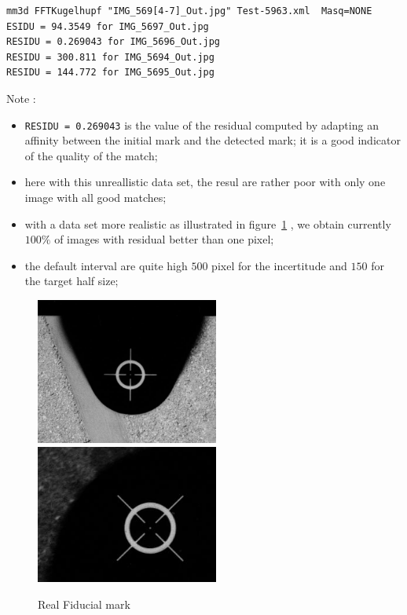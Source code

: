 \begin{verbatim}
mm3d FFTKugelhupf "IMG_569[4-7]_Out.jpg" Test-5963.xml  Masq=NONE 
ESIDU = 94.3549 for IMG_5697_Out.jpg
RESIDU = 0.269043 for IMG_5696_Out.jpg
RESIDU = 300.811 for IMG_5694_Out.jpg
RESIDU = 144.772 for IMG_5695_Out.jpg
\end{verbatim}

Note :

\begin{itemize}
    \item  {\tt RESIDU = 0.269043} is the value of the residual computed by adapting an affinity
          between the initial mark and the detected mark; it is a good  indicator of the quality
          of the match;
    \item  here with this unreallistic data set, the resul are rather poor with only one image with all good matches;
    \item with a data set more realistic as illustrated in figure~\ref{ImFidMark} , we obtain currently $100\%$ of images
          with residual better than one pixel;
    \item  the default interval are quite high $500$ pixel for the incertitude and $150$ for the target half size;
\end{itemize}

\begin{figure}
   \includegraphics[width=60mm]{FIGS/Niche/Fid1.jpg}
   \includegraphics[width=60mm]{FIGS/Niche/Fid2.jpg}
\caption{Real Fiducial mark}
\label{ImFidMark}
\end{figure}


